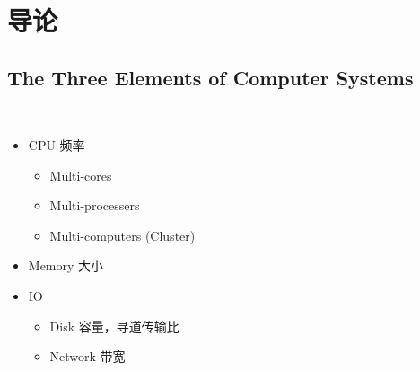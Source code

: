 \section{导论}

\subsection{The Three Elements of Computer Systems}
\begin{frame}
  \frametitle{\subsecname}
  \begin{columns}[c]
    \begin{itemize}
      \item CPU 频率
        \begin{itemize}
          \item Multi-cores
          \item Multi-processers
          \item Multi-computers (Cluster)
        \end{itemize}
      \item Memory 大小
      \item IO
        \begin{itemize}
          \item Disk 容量，寻道传输比
          \item Network 带宽
        \end{itemize}
    \end{itemize}
    \centering{}
  \end{columns}
\end{frame}

